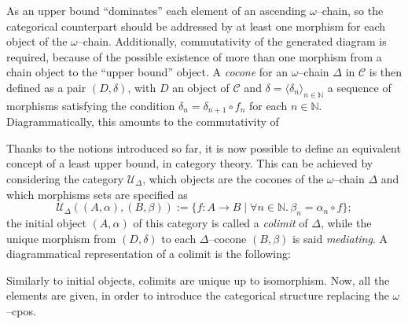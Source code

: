 As an upper bound ``dominates'' each element of an ascending \(\omega\)--chain, so the categorical counterpart should be addressed by at least one morphism for each object of the \(\omega\)--chain. %
Additionally, commutativity of the generated diagram is required, because of the possible existence of more than one morphism from a chain object to the ``upper bound'' object.
A \emph{cocone} for an \(\omega\)--chain \(\Delta\) in \(\mathcal{C}\) is %
then defined as a pair \((D, \delta)\), with \(D\) an object of
\(\mathcal{C}\) and \(\delta = {\langle\delta_n\rangle}_{n\in\mathbb{N}}\)
a sequence of morphisms satisfying the condition
\(\delta_n = \delta_{n+1} \circ f_n\) for each \(n \in \mathbb{N}\). Diagrammatically, this amounts to the commutativity of
  \begin{center}
  \end{center}

Thanks to the notions introduced so far, it is now possible to define an equivalent concept of a least upper bound, in category theory.
This can be achieved by considering the category \(\mathcal{U}_\Delta\), which objects are the cocones of the \(\omega\)--chain \(\Delta\) and which morphisms sets are specified as %
\begin{equation*}
  \mathcal{U}_\Delta((A,\alpha),(B,\beta)) := \lbrace f \colon A \to B \mid
  \forall n \in \mathbb{N}.\,\beta_n = \alpha_n \circ f \rbrace;
\end{equation*}
the initial object \((A, \alpha)\) of this category is called a \emph{colimit} of \(\Delta\), while the unique morphism from \((D,\delta)\) to each \(\Delta\)--cocone \((B, \beta)\) is said \emph{mediating}. %
A diagrammatical representation of a colimit is the following:
\begin{center}
\end{center}
Similarly to initial objects, colimits are unique up to isomorphism.
Now, all the elements are given, in order to introduce the categorical structure replacing the \(\omega\)--cpos. %

